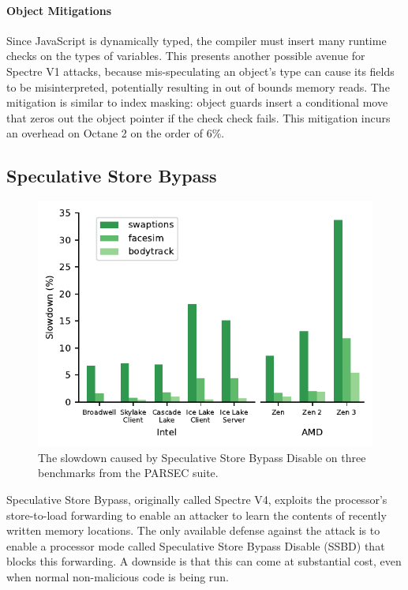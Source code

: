 \paragraph{Object Mitigations}

Since JavaScript is dynamically typed, the compiler must insert many runtime checks on the types of variables.
This presents another possible avenue for Spectre V1 attacks, because mis-speculating an object's type can cause its fields to be misinterpreted, potentially resulting in out of bounds memory reads.
The mitigation is similar to index masking: object guards insert a conditional move that zeros out the object pointer if the check check fails.
This mitigation incurs an overhead on Octane 2 on the order of 6\%.

\subsection{Speculative Store Bypass}
\label{sec:ssb}

\begin{figure}[h]
  \includegraphics[width=\columnwidth]{plots/ssbd.pdf}
  \caption{The slowdown caused by Speculative Store Bypass Disable on three benchmarks from the PARSEC suite.}
  \label{fig:ssbd}
\end{figure}

Speculative Store Bypass, originally called Spectre V4, exploits the processor's store-to-load forwarding to enable an attacker to learn the contents of recently written memory locations.
The only available defense against the attack is to enable a processor mode called Speculative Store Bypass Disable (SSBD) that blocks this forwarding.
A downside is that this can come at substantial cost, even when normal non-malicious code is being run.

